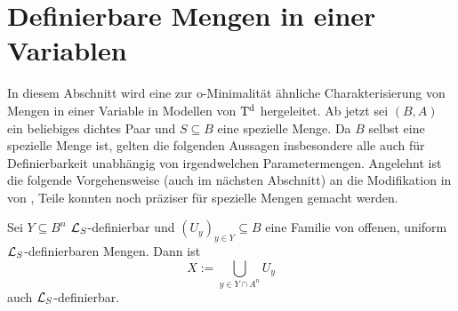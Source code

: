 \section{Definierbare Mengen in einer Variablen}
In diesem Abschnitt wird eine zur o-Minimalität ähnliche Charakterisierung von Mengen in einer Variable in Modellen von $\operatorname{T^d}$ hergeleitet. Ab jetzt sei $(B,A)$ ein beliebiges dichtes Paar und $S\subseteq B$ eine spezielle Menge. Da $B$ selbst eine spezielle Menge ist, gelten die folgenden Aussagen insbesondere alle auch für Definierbarkeit unabhängig von irgendwelchen Parametermengen. Angelehnt ist die folgende Vorgehensweise (auch im nächsten Abschnitt) an die Modifikation in \cite{Piz} von \cite{VanDenDries}, Teile konnten noch präziser für spezielle Mengen gemacht werden.

\begin{lemma}
	Sei $Y\subseteq B^n$ $\mathcal{L}_S$-definierbar und $(U_y)_{y\in Y}\subseteq B$ eine Familie von offenen, uniform $\mathcal{L}_S$-definierbaren Mengen. Dann ist $$X:=\bigcup\limits_{y\in Y\cap A^n}U_y$$ auch $\mathcal{L}_S$-definierbar.
\end{lemma}
